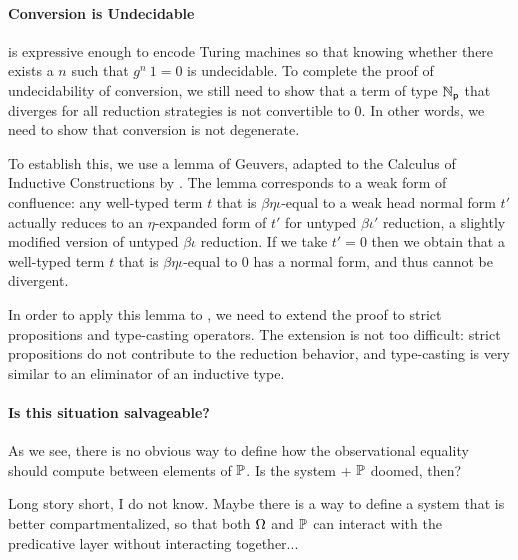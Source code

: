 
\paragraph{Conversion is Undecidable}

\SetoidCC is expressive enough to encode Turing machines so that
knowing whether there exists a \( n \) such that \( g^n\ 1 = 0 \) is
undecidable.
%
To complete the proof of undecidability of conversion, we still need
to show that a term of type \( \mathbb{N}_{\mathsf{p}} \) that diverges for all reduction strategies is not
convertible to $0$. In other words, we need to show that conversion is
not degenerate.

To establish this, we use a lemma of Geuvers, adapted to the 
Calculus of Inductive Constructions by .
The lemma corresponds to a weak form of confluence: any well-typed term
\( t \) that is \( \beta \eta \iota \)-equal to a weak head normal form
\( t' \) actually reduces to an \( \eta \)-expanded form of \( t' \) for 
untyped \( \beta \iota' \) reduction, a slightly modified version of 
untyped \( \beta \iota \) reduction. 
% 
If we take \( t' = 0 \) then we obtain that a well-typed term \( t \) that
is \( \beta \eta \iota \)-equal to 0 has a normal form, and thus cannot be
divergent. 

In order to apply this lemma to \SetoidCC, we need to extend the proof to 
strict propositions and type-casting operators. The extension is not too
difficult: strict propositions do not contribute to the reduction behavior, 
and type-casting is very similar to an eliminator of an inductive type.

\paragraph{Is this situation salvageable?}
% 
As we see, there is no obvious way to define how the observational equality 
should compute between elements of \( \mathbb{P} \). 
% 
Is the system \SetoidCC + \( \mathbb{P} \) doomed, then?

Long story short, I do not know. Maybe there is a way to define a system that
is better compartmentalized, so that both \( \Omega \) and \( \mathbb{P} \) can 
interact with the predicative layer without interacting together...